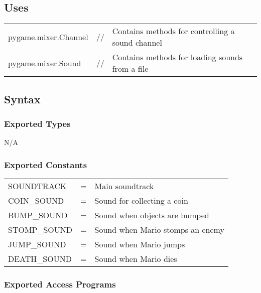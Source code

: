 \documentclass[12pt]{article}
\begin{document}
\subsection* {Uses}

\begin{tabular}{lll}
    pygame.mixer.Channel & // & Contains methods for controlling a sound channel\\
    pygame.mixer.Sound   & // & Contains methods for loading sounds from a file
\end{tabular}
\subsection* {Syntax}

\subsubsection* {Exported Types}

N/A

\subsubsection* {Exported Constants}

\begin{tabular}{lll}
    SOUNDTRACK   & = & Main soundtrack\\
    COIN\_SOUND  & = & Sound for collecting a coin\\
    BUMP\_SOUND  & = & Sound when objects are bumped\\
    STOMP\_SOUND & = & Sound when Mario stomps an enemy\\
    JUMP\_SOUND  & = & Sound when Mario jumps\\
    DEATH\_SOUND & = & Sound when Mario dies
\end{tabular}
\subsubsection* {Exported Access Programs}
\end{document}
